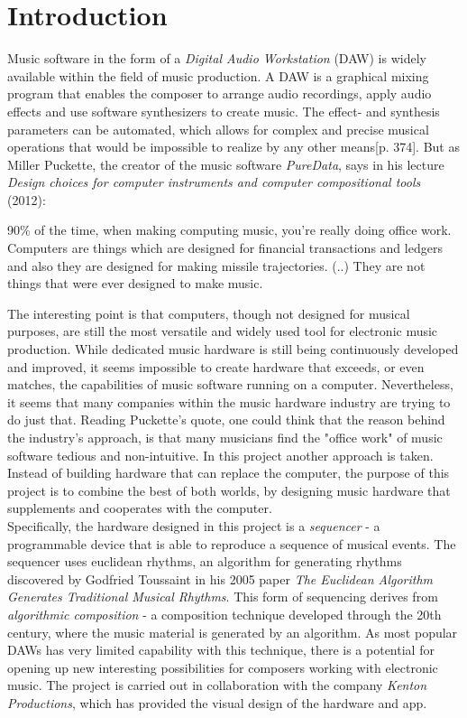 \chapter{Introduction}

Music software in the form of a \textit{Digital Audio Workstation} (DAW) is widely available within the field of music production. A DAW is a graphical mixing program that enables the composer to arrange audio recordings, apply audio effects and use software synthesizers to create music. The effect- and synthesis parameters can be automated, which allows for complex and precise musical operations that would be impossible to realize by any other means\cite{roads}[p. 374]. But as Miller Puckette, the creator of the music software \textit{PureData}, says in his lecture \textit{Design choices for computer instruments and computer compositional tools} (2012):
\begin{displayquote}
90\% of the time, when making computing music, you're really doing office work. Computers are things which are designed for financial transactions and ledgers and also they are designed for making missile trajectories. (..) They are not things that were ever designed to make music. \cite{puckette}
\end{displayquote}
The interesting point is that computers, though not designed for musical purposes, are still the most versatile and widely used tool for electronic music production. While dedicated music hardware is still being continuously developed and improved, it seems impossible to create hardware that exceeds, or even matches, the capabilities of music software running on a computer. Nevertheless, it seems that many companies within the music hardware industry are trying to do just that. Reading Puckette's quote, one could think that the reason behind the industry's approach, is that many musicians find the "office work" of music software tedious and non-intuitive. In this project another approach is taken. Instead of building hardware that can replace the computer, the purpose of this project is to combine the best of both worlds, by designing music hardware that supplements and cooperates with the computer.\\
Specifically, the hardware designed in this project is a \textit{sequencer} - a programmable device that is able to reproduce a sequence of musical events. The sequencer uses euclidean rhythms, an algorithm for generating rhythms discovered by Godfried Toussaint in his 2005 paper \textit{The Euclidean Algorithm Generates Traditional Musical Rhythms}. This form of sequencing derives from \textit{algorithmic composition} - a composition technique developed through the 20th century, where the music material is generated by an algorithm. As most popular DAWs has very limited capability with this technique, there is a potential for opening up new interesting possibilities for composers working with electronic music. The project is carried out in collaboration with the company \textit{Kenton Productions}, which has provided the visual design of the hardware and app.

